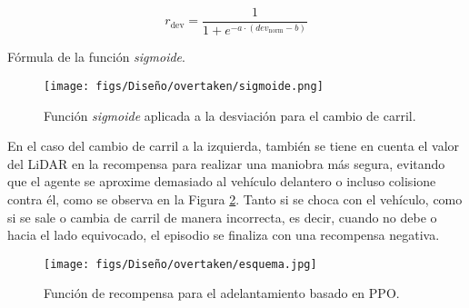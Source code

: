   \begin{myequation}[H]
    \begin{equation} 
       r_{\text{dev}} = \frac{1}{1 + e^{-a \cdot (dev_{\text{norm}} - b)}}
    \end{equation} 
    \caption{Fórmula de la función \textit{sigmoide}.}
\label{eq:sigmoid_deviation}
  \end{myequation}

\begin{figure}[ht]
\centering
\texttt{[image: figs/Diseño/overtaken/sigmoide.png]}
\caption{Función \textit{sigmoide} aplicada a la desviación para el cambio de carril.}
\label{fig:sigmoide}
\end{figure}

\newpage

En el caso del cambio de carril a la izquierda, también se tiene en cuenta el valor del \ac{LiDAR} en la recompensa para realizar una maniobra más segura, evitando que el agente se aproxime demasiado al vehículo delantero o incluso colisione contra él, como se observa en la Figura \ref{fig:esquema_over}. Tanto si se choca con el vehículo, como si se sale o cambia de carril de manera incorrecta, es decir, cuando no debe o hacia el lado equivocado, el episodio se finaliza con una recompensa negativa.
\begin{figure}[ht]
\centering
\texttt{[image: figs/Diseño/overtaken/esquema.jpg]}
\caption{Función de recompensa para el adelantamiento basado en \ac{PPO}.}
\label{fig:esquema_over}
\end{figure}

